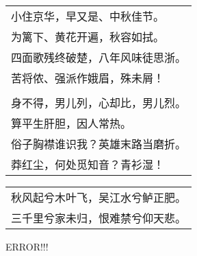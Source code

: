 \nopagebreak%
\nopagebreak%
\noindent\begin{minipage}{\linewidth}
  \vskip-3pt\begin{table}[H]
    \centering
    \begin{tabular}{@{}l@{}}
小住京华，早又是、中秋佳节。\\
为篱下、黄花开遍，秋容如拭。\\
四面歌残终破楚，八年风味徒思浙。\\
苦将侬、强派作娥眉，殊未屑！\\
\\
身不得，男儿列，心却比，男儿烈。\\
算平生肝胆，因人常热。\\
俗子胸襟谁识我？英雄末路当磨折。\\
莽红尘，何处觅知音？青衫湿！
    \end{tabular}
  \end{table}
\end{minipage}
\vspace{1cm}


\nopagebreak%
\nopagebreak%
\noindent\begin{minipage}{\linewidth}
  \vskip-3pt\begin{table}[H]
    \centering
    \begin{tabular}{@{}l@{}}
秋风起兮木叶飞，吴江水兮鲈正肥。\\
三千里兮家未归，恨难禁兮仰天悲。
    \end{tabular}
  \end{table}
\end{minipage}
\vspace{1cm}


ERROR!!!

